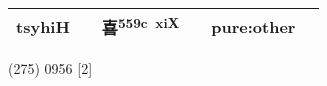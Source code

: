 \documentclass[14pt,a4paper]{scrartcl}
\begin{document}
\begin{longtable}[c]{@{}llllll@{}}
\begin{minipage}[t]{0.14\columnwidth}
tsyhiH
\strut\end{minipage} &
\begin{minipage}[t]{0.14\columnwidth}\raggedright\strut
\strut\end{minipage} &
\begin{minipage}[t]{0.14\columnwidth}\raggedright\strut
喜\textsuperscript{559c~xiX}
\strut\end{minipage} &
\begin{minipage}[t]{0.14\columnwidth}\raggedright\strut
\strut\end{minipage} &
\begin{minipage}[t]{0.14\columnwidth}\raggedright\strut
pure:other
\strut\end{minipage}\tabularnewline
\bottomrule
\end{longtable}

(275) 0956 {[}2{]}
\end{document}
